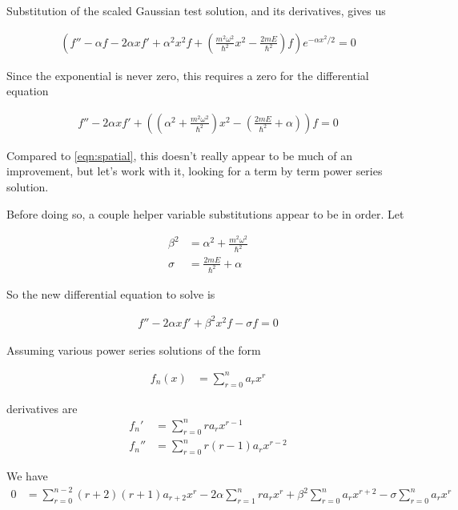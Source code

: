 \documentclass{article}
\begin{document}
Substitution of the scaled Gaussian test solution, and its derivatives, gives us

\begin{align*}
\left( f'' - \alpha f - 2 \alpha x f' + \alpha^2 x^2 f + \left( \frac{m^2 \omega^2}{\hbar^2} x^2 - \frac{2 m E}{\hbar^2} \right) f \right) e^{ -\alpha x^2 /2} = 0
\end{align*}

Since the exponential is never zero, this requires a zero for the differential equation

\begin{align}
f'' - 2 \alpha x f' + \left( \left(\alpha^2 + \frac{m^2 \omega^2}{\hbar^2} \right) x^2 - \left(\frac{2 m E}{\hbar^2} + \alpha \right) \right) f = 0
\end{align}

Compared to \ref{eqn:spatial}, this doesn't really appear to be much of an improvement, but let's work with it, looking for a term by term power series solution.

Before doing so, a couple helper variable substitutions appear to be in order.  Let

\begin{align*}
\beta^2 &= \alpha^2 + \frac{m^2 \omega^2}{\hbar^2}  \\
\sigma &= \frac{2 m E}{\hbar^2} + \alpha 
\end{align*}

So the new differential equation to solve is

\begin{align}
f'' - 2 \alpha x f' + \beta^2 x^2 f - \sigma f = 0
\end{align}

Assuming various power series solutions of the form

\begin{align*}
f_n(x) &= \sum_{r=0}^n a_r x^r
\end{align*}

derivatives are
\begin{align*}
f_n' &= \sum_{r=0}^n r a_r x^{r-1} \\
f_n'' &= \sum_{r=0}^n r(r-1) a_r x^{r-2}
\end{align*}

We have 
\begin{align*}
0 &= \sum_{r=0}^{n-2} (r+2)(r+1) a_{r+2} x^{r}
 - 2 \alpha \sum_{r=1}^n r a_r x^{r}
+ \beta^2
\sum_{r=0}^n a_r x^{r+2} 
- \sigma \sum_{r=0}^n a_r x^r
\end{align*}
\end{document}
